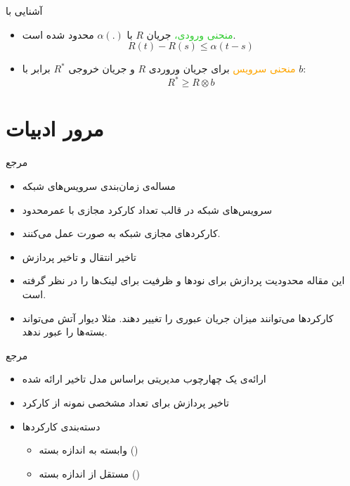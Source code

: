 \documentclass[dvipsnames]{beamer}
\makeatletter
\newcommand{\RTList}{\raggedleft\rightskip\@totalleftmargin}
\makeatother
\begin{document}
\begin{persian}
	\begin{frame}{آشنایی با }
		\begin{itemize}\RTList{}
			\justifying%
		  \item \textcolor{LimeGreen}{منحنی ورودی،}
				جریان \(R\) با \( \alpha(.) \) محدود شده است.
			\[ R(t) - R(s) \le \alpha(t - s) \]
		  \item \textcolor{Orange}{منحنی سرویس}
				برای جریان وروردی \(R\) و جریان خروجی \(R^{*}\) برابر با \(b\):
			\[ R^{*} \ge R \otimes b \]
		\end{itemize}
	\end{frame}

	\section{مرور ادبیات}

	\begin{frame}{مرجع~\cite{Qu2016}}
		\begin{itemize}\RTList{}
			\justifying%
			\item مساله‌ی زمان‌بندی سرویس‌های شبکه
			\item سرویس‌های شبکه در قالب تعداد کارکرد مجازی با عمرمحدود
			\item کارکردهای مجازی شبکه به صورت  عمل می‌کنند.
			\item تاخیر انتقال و تاخیر پردازش
			\item این مقاله محدودیت پردازش برای نودها و ظرفیت برای لینک‌ها را در نظر گرفته است.
			\item کارکردها می‌توانند میزان جریان عبوری را تغییر دهند. مثلا دیوار آتش می‌تواند بسته‌ها را عبور ندهد.
		\end{itemize}
	\end{frame}

	\begin{frame}{مرجع~\cite{Li2017}}
		\begin{itemize}\RTList{}
				\justifying%
				\item ارائه‌ی یک چهارچوب مدیریتی براساس مدل تاخیر ارائه شده
				\item تاخیر پردازش برای تعداد مشخصی نمونه از کارکرد
				\item دسته‌بندی کارکردها
				\begin{itemize}\RTList{}
						\item وابسته به اندازه بسته ()
						\item مستقل از اندازه بسته ()
				\end{itemize}
		\end{itemize}
	\end{frame}


\end{persian}
\end{document}
